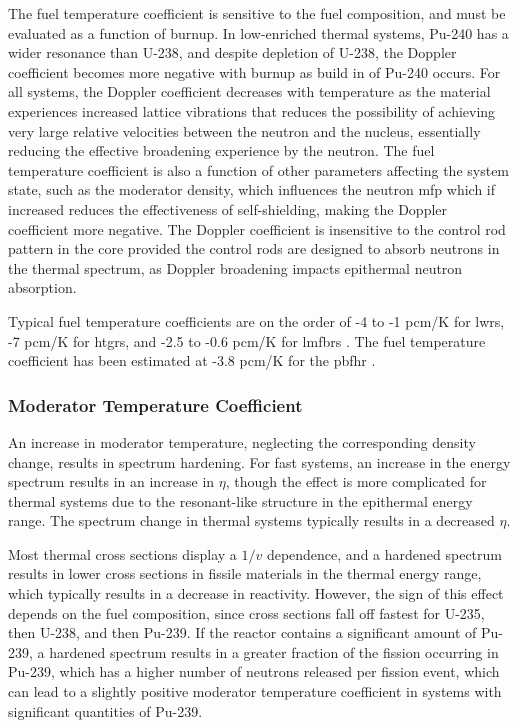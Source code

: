 The fuel temperature coefficient is sensitive to the fuel composition, and must be evaluated as a function of burnup. In low-enriched thermal systems, Pu-240 has a wider resonance than U-238, and despite depletion of U-238, the Doppler coefficient becomes more negative with burnup as build in of Pu-240 occurs. For all systems, the Doppler coefficient decreases with temperature as the material experiences increased lattice vibrations that reduces the possibility of achieving very large relative velocities between the neutron and the nucleus, essentially reducing the effective broadening experience by the neutron. The fuel temperature coefficient is also a function of other parameters affecting the system state, such as the moderator density, which influences the neutron \gls{mfp} which if increased reduces the effectiveness of self-shielding, making the Doppler coefficient more negative. The Doppler coefficient is insensitive to the control rod pattern in the core provided the control rods are designed to absorb neutrons in the thermal spectrum, as Doppler broadening impacts epithermal neutron absorption.

Typical fuel temperature coefficients are on the order of -4 to -1 pcm/K for \glspl{lwr}, -7 pcm/K for \glspl{htgr}, and -2.5 to -0.6 pcm/K for \glspl{lmfbr} \cite{duderstadt}. The fuel temperature coefficient has been estimated at -3.8 pcm/K for the \gls{pbfhr} \cite{xin_wang_thesis}.

\subsubsection{Moderator Temperature Coefficient}
An increase in moderator temperature, neglecting the corresponding density change, results in spectrum hardening. For fast systems, an increase in the energy spectrum results in an increase in \(\eta\), though the effect is more complicated for thermal systems due to the resonant-like structure in the epithermal energy range. The spectrum change in thermal systems typically results in a decreased \(\eta\).

Most thermal cross sections display a \(1/v\) dependence, and a hardened spectrum results in lower cross sections in fissile materials in the thermal energy range, which typically results in a decrease in reactivity. However, the sign of this effect depends on the fuel composition, since cross sections fall off fastest for U-235, then U-238, and then Pu-239. If the reactor contains a significant amount of Pu-239, a hardened spectrum results in a greater fraction of the fission occurring in Pu-239, which has a higher number of neutrons released per fission event, which can lead to a slightly positive moderator temperature coefficient in systems with significant quantities of Pu-239. 

